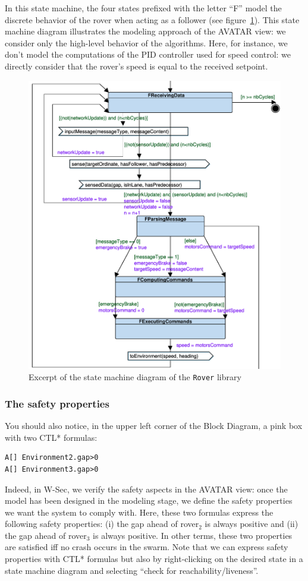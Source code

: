 \documentclass{article}
\begin{document}
In this state machine, the four states prefixed with the letter ``F'' model the discrete behavior of the rover when acting as a follower (see figure~\ref{fig:roversmd}). This state machine diagram illustrates the modeling approach of the AVATAR view: we consider only the high-level behavior of the algorithms. Here, for instance, we don't model the computations of the PID controller used for speed control: we directly consider that the rover's speed is equal to the received setpoint.

\begin{figure}
	\centering
	\includegraphics[scale=.6]{figures/roverfsm.pdf}
	\caption{Excerpt of the state machine diagram of the \texttt{Rover} library}
	\label{fig:roversmd}
\end{figure}

\subsubsection{The safety properties}

You should also notice, in the upper left corner of the Block Diagram, a pink box with two CTL* formulas:
\begin{verbatim}
A[] Environment2.gap>0
A[] Environment3.gap>0
\end{verbatim}
Indeed, in W-Sec, we verify the safety aspects in the AVATAR view: once the model has been designed in the modeling stage, we define the safety properties we want the system to comply with. Here, these two formulas express the following safety properties: (i) the gap ahead of rover$_2$ is always positive and (ii) the gap ahead of rover$_3$ is always positive. In other terms, these two properties are satisfied iff no crash occurs in the swarm. Note that we can express safety properties with CTL* formulas but also by right-clicking on the desired state in a state machine diagram and selecting ``check for reachability/liveness''.
\end{document}
